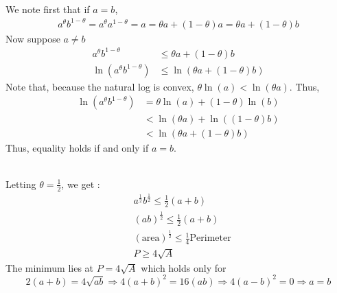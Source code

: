\documentclass[letterpaper,12pt]{article}
\theoremstyle{definition}
\begin{document}
\\
We note first that if $a=b$, 
\begin{align*}
    a^\theta b^{1-\theta} =a^\theta a^{1-\theta} = a = \theta a + (1-\theta)a = \theta a + (1-\theta)b
\end{align*}
Now suppose $a \neq b$
\begin{align*}
a^\theta b^{1-\theta} &\leq \theta a + (1-\theta)b\\
\ln(a^\theta b^{1-\theta}) &\leq \ln(\theta a + (1-\theta)b)
\end{align*}
Note that, because the natural log is convex, $\theta \ln(a) < \ln(\theta a)$. Thus,
\begin{align*}
    \ln(a^\theta b^{1-\theta}) &= \theta \ln(a) + (1-\theta)\ln(b)\\
    & < \ln(\theta a ) + \ln( (1-\theta) b) \\
    & < \ln( \theta a + (1- \theta)b) 
\end{align*}
Thus, equality holds if and only if $a = b$.

\\
Letting $\theta=\frac{1}{2}$, we get : 
\begin{align*}
&a^\frac{1}{2}b^\frac{1}{2} \leq \frac{1}{2} (a+b) \\
&(ab)^\frac{1}{2} \leq \frac{1}{2} (a+b) \\
&(\text{area})^\frac{1}{2} \leq \frac{1}{4} \text{Perimeter} \\
& P \geq 4 \sqrt{A}
\end{align*}
The minimum lies at $P=4 \sqrt{A}$ which holds only for 
\[2(a+b)=4\sqrt{ab} \Rightarrow 4(a+b)^2 = 16(ab) \Rightarrow 4(a-b)^2=0 \Rightarrow a=b \]
\end{document}
